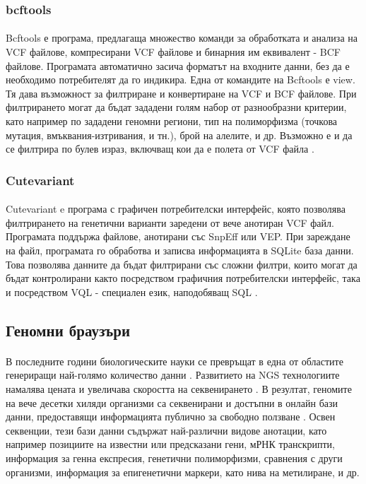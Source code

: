\documentclass[pdftex,cyrillic,14pt,a4page,twoside,openright]{extreport}
\begin{document}
\subsubsection{bcftools}
\paragraph{}
Bcftools е програма, предлагаща множество команди за обработката и анализа на VCF файлове, компресирани VCF файлове и бинарния им еквивалент - BCF файлове. Програмата автоматично засича форматът на входните данни, без да е необходимо потребителят да го индикира. Една от командите на Bcftools е view. Тя дава възможност за филтриране и конвертиране на VCF и BCF файлове. При филтрирането могат да бъдат зададени голям набор от разнообразни критерии, като например по зададени геномни региони, тип на полиморфизма (точкова мутация, вмъквания-изтривания, и тн.), брой на алелите, и др. Възможно е и да се филтрира по булев израз, включващ кои да е полета от VCF файла \cite{danecek2021}.


\subsubsection{Cutevariant}\label{sec:cutevariant}
\paragraph{}
Cutevariant e програма с графичен потребителски интерфейс, която позволява филтрирането на генетични варианти заредени от вече анотиран VCF файл. Програмата поддържа файлове, анотирани със SnpEff или VEP. При зареждане на файл, програмата го обработва и записва информацията в SQLite база данни. Това позволява данните да бъдат филтрирани със сложни филтри, които могат да бъдат контролирани както посредством графичния потребителски интерфейс, така и посредством VQL - специален език, наподобяващ SQL \cite{schutz2021}.

\subsection{Геномни браузъри}
\paragraph{}
В последните години биологическите науки се превръщат в една от областите генериращи най-голямо количество данни \cite{Stephens2015}. Развитието на NGS технологиите намалява цената и увеличава скоростта на секвенирането \cite{schuster2008}. В резултат, геномите на вече десетки хиляди организми са секвенирани и достъпни в онлайн бази данни, предоставящи информацията публично за свободно ползване \cite{mukherjee2020}. Освен секвенции, тези бази данни съдържат най-различни видове анотации, като например позициите на известни или предсказани гени, мРНК транскрипти, информация за генна експресия, генетични полиморфизми, сравнения с други организми, информация за епигенетични маркери, като нива на метилиране, и др.
\end{document}
